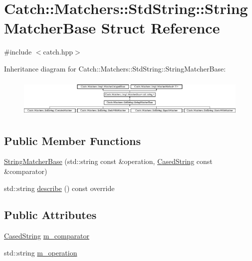\hypertarget{struct_catch_1_1_matchers_1_1_std_string_1_1_string_matcher_base}{}\section{Catch\+:\+:Matchers\+:\+:Std\+String\+:\+:String\+Matcher\+Base Struct Reference}
\label{struct_catch_1_1_matchers_1_1_std_string_1_1_string_matcher_base}


{\ttfamily \#include $<$catch.\+hpp$>$}

Inheritance diagram for Catch\+:\+:Matchers\+:\+:Std\+String\+:\+:String\+Matcher\+Base\+:\begin{figure}[H]
\begin{center}
\leavevmode
\includegraphics[height=1.879195cm]{struct_catch_1_1_matchers_1_1_std_string_1_1_string_matcher_base}
\end{center}
\end{figure}
\subsection*{Public Member Functions}
\begin{DoxyCompactItemize}
\item 
\mbox{\hyperlink{struct_catch_1_1_matchers_1_1_std_string_1_1_string_matcher_base_a3a9b66bae298ae27058478529b4bb39d}{String\+Matcher\+Base}} (std\+::string const \&operation, \mbox{\hyperlink{struct_catch_1_1_matchers_1_1_std_string_1_1_cased_string}{Cased\+String}} const \&comparator)
\item 
std\+::string \mbox{\hyperlink{struct_catch_1_1_matchers_1_1_std_string_1_1_string_matcher_base_a47af030f8cea42a601ffb1000eea5cca}{describe}} () const override
\end{DoxyCompactItemize}
\subsection*{Public Attributes}
\begin{DoxyCompactItemize}
\item 
\mbox{\hyperlink{struct_catch_1_1_matchers_1_1_std_string_1_1_cased_string}{Cased\+String}} \mbox{\hyperlink{struct_catch_1_1_matchers_1_1_std_string_1_1_string_matcher_base_a17c9f0fe40587070ffe998c193742831}{m\+\_\+comparator}}
\item 
std\+::string \mbox{\hyperlink{struct_catch_1_1_matchers_1_1_std_string_1_1_string_matcher_base_a7a25c4b7d863e9a1c406d81efd0f83ca}{m\+\_\+operation}}
\end{DoxyCompactItemize}
